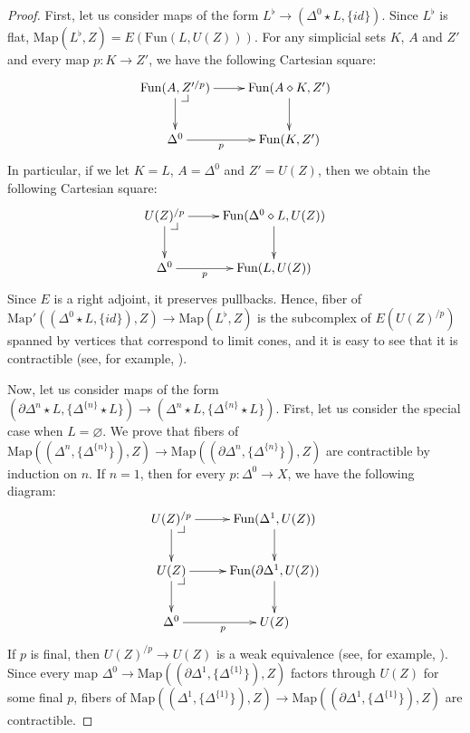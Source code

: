 \documentclass[reqno]{amsart}
\makeatletter
\theoremstyle{definition}
\theoremstyle{remark}
\newcommand{\join}{\star}
\newcommand{\fjoin}{\diamond}
\newcommand{\Map}{\mathrm{Map}}
\newcommand{\Fun}{\mathrm{Fun}}
\numberwithin{figure}{section}
\newcommand{\pb}[1][dr]{\save*!/#1-1.2pc/#1:(-1,1)@^{|-}\restore}
\makeatother
\begin{document}
\begin{proof}
First, let us consider maps of the form $L^\flat \to (\Delta^0 \join L, \{ id \})$.
Since $L^\flat$ is flat, $\Map(L^\flat,Z) = E(\Fun(L,U(Z)))$.
For any simplicial sets $K$, $A$ and $Z'$ and every map $p : K \to Z'$, we have the following Cartesian square:
\[ \xymatrix{ \Fun(A,Z'^{/p}) \ar[r] \ar[d] \pb & \Fun(A \fjoin K, Z') \ar[d] \\
              \Delta^0 \ar[r]_-p & \Fun(K,Z')
            } \]
In particular, if we let $K = L$, $A = \Delta^0$ and $Z' = U(Z)$, then we obtain the following Cartesian square:
\[ \xymatrix{ U(Z)^{/p} \ar[r] \ar[d] \pb & \Fun(\Delta^0 \fjoin L, U(Z)) \ar[d] \\
              \Delta^0 \ar[r]_-p & \Fun(L,U(Z))
            } \]
Since $E$ is a right adjoint, it preserves pullbacks.
Hence, fiber of $\Map'((\Delta^0 \join L, \{ id \}), Z) \to \Map(L^\flat, Z)$ is the subcomplex of $E(U(Z)^{/p})$
spanned by vertices that correspond to limit cones, and it is easy to see that it is contractible (see, for example, \cite[Lemma~2.11]{szumilo}).

Now, let us consider maps of the form $(\partial \Delta^n \join L, \{ \Delta^{\{n\}} \join L \}) \to (\Delta^n \join L, \{ \Delta^{\{n\}} \join L \})$.
First, let us consider the special case when $L = \varnothing$.
We prove that fibers of $\Map((\Delta^n, \{ \Delta^{\{n\}} \}), Z) \to \Map((\partial \Delta^n, \{ \Delta^{\{n\}} \}), Z)$ are contractible by induction on $n$.
If $n = 1$, then for every $p : \Delta^0 \to X$, we have the following diagram:
\[ \xymatrix{ U(Z)^{/p} \ar[d] \ar[r] \pb & \Fun(\Delta^1, U(Z)) \ar[d] \\
              U(Z) \ar[d] \ar[r] \pb & \Fun(\partial \Delta^1, U(Z)) \ar[d] \\
              \Delta^0 \ar[r]_p & U(Z)
            } \]
If $p$ is final, then $U(Z)^{/p} \to U(Z)$ is a weak equivalence (see, for example, \cite[Corollary~1.2.12.5]{lurie-topos}).
Since every map $\Delta^0 \to \Map((\partial \Delta^1, \{ \Delta^{\{1\}} \}), Z)$ factors through $U(Z)$ for some final $p$,
fibers of $\Map((\Delta^1, \{ \Delta^{\{1\}} \}), Z) \to \Map((\partial \Delta^1, \{ \Delta^{\{1\}} \}), Z)$ are contractible.


\end{proof}
\end{document}

